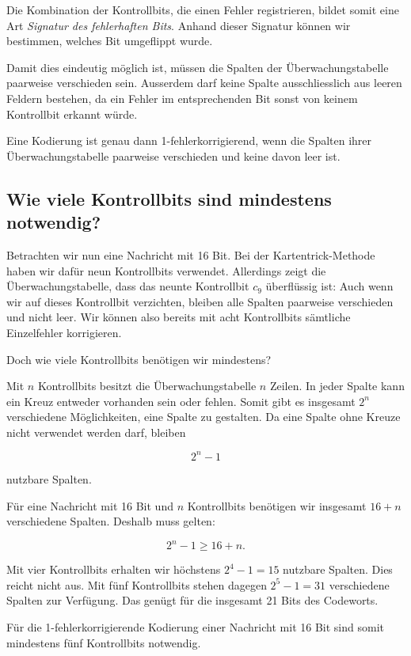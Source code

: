 Die Kombination der Kontrollbits, die einen Fehler registrieren,
bildet somit eine Art \emph{Signatur des fehlerhaften Bits}.
Anhand dieser Signatur können wir bestimmen, welches Bit
umgeflippt wurde.

Damit dies eindeutig möglich ist, müssen die Spalten der
Überwachungstabelle paarweise verschieden sein. Ausserdem darf
keine Spalte ausschliesslich aus leeren Feldern bestehen, da
ein Fehler im entsprechenden Bit sonst von keinem Kontrollbit
erkannt würde.
\begin{myremark}
	Eine Kodierung ist genau dann 1-fehlerkorrigierend,
	wenn die Spalten ihrer Überwachungstabelle paarweise verschieden
	und keine davon leer ist.
\end{myremark}



\subsection*{Wie viele Kontrollbits sind mindestens notwendig?}

Betrachten wir nun eine Nachricht mit 16 Bit. Bei der
Kartentrick-Methode haben wir dafür neun Kontrollbits verwendet.
Allerdings zeigt die Überwachungstabelle, dass das neunte
Kontrollbit \(c_9\) überflüssig ist: Auch wenn wir auf dieses
Kontrollbit verzichten, bleiben alle Spalten paarweise
verschieden und nicht leer. Wir können also bereits mit
acht Kontrollbits sämtliche Einzelfehler korrigieren.

Doch wie viele Kontrollbits benötigen wir mindestens?

Mit \(n\) Kontrollbits besitzt die Überwachungstabelle \(n\) Zeilen.
In jeder Spalte kann ein Kreuz entweder vorhanden sein oder
fehlen. Somit gibt es insgesamt \(2^n\) verschiedene Möglichkeiten,
eine Spalte zu gestalten. Da eine Spalte ohne Kreuze nicht
verwendet werden darf, bleiben

\[
	2^n-1
\]

nutzbare Spalten.

Für eine Nachricht mit 16 Bit und \(n\) Kontrollbits benötigen
wir insgesamt \(16+n\) verschiedene Spalten. Deshalb muss gelten:

\[
	2^n-1\geq 16+n.
\]

Mit vier Kontrollbits erhalten wir höchstens
\(2^4-1=15\) nutzbare Spalten. Dies reicht nicht aus.
Mit fünf Kontrollbits stehen dagegen
\(2^5-1=31\) verschiedene Spalten zur Verfügung.
Das genügt für die insgesamt 21 Bits des Codeworts.

Für die 1-fehlerkorrigierende Kodierung einer Nachricht
mit 16 Bit sind somit mindestens fünf Kontrollbits notwendig.

